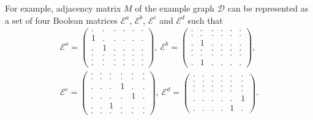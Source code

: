 For example, adjacency matrix $M$ of the example graph $\mathcal{D}$ can be represented as a set of four Boolean matrices $\mathcal{E}^a$, $\mathcal{E}^b$, $\mathcal{E}^c$ and $\mathcal{E}^d$ such that 
\begin{align*}
\mathcal{E}^a =
\begin{pmatrix}
    . & . & . & . & . & .   \\
    1 & . & . & . & . & . \\
    . & 1 & . & . & . & .\\
    . & . & . & . & . & . \\ 
    . & . & . & . & . & . \\ 
    . & . & . & . & . & .
\end{pmatrix},~  
\mathcal{E}^b =
\begin{pmatrix}
    . & . & . & . & . & .   \\
    . & . & . & . & . & . \\
    . & 1 & . & . & . & .\\
    . & . & . & . & . & . \\ 
    . & . & . & . & . & . \\ 
    . & 1 & . & . & . & .
\end{pmatrix},\\
\mathcal{E}^c =
\begin{pmatrix}
    . & . & . & . & . & .   \\
    . & . & . & . & . & . \\
    . & . & . & 1 & . & .\\
    . & . & . & . & 1 & . \\ 
    . & . & 1 & . & . & . \\ 
    . & . & . & . & . & .
\end{pmatrix},~ 
\mathcal{E}^d =
\begin{pmatrix}
    . & . & . & . & . & .   \\
    . & . & . & . & . & . \\
    . & . & . & . & . & .\\
    . & . & . & . & . & . \\ 
    . & . & . & . & . & 1 \\ 
    . & . & . & . & 1 & .
\end{pmatrix}.
\label{eq:boolean_decomposition_of_graph}
\end{align*}

